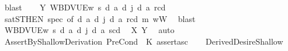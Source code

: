 \begin{isabellebody}
\ blast\isanewline
\ \ \isamarkupfalse%
\ Y{\isacharcolon}{\kern0pt}\ {\isachardoublequoteopen}{\isasymlangle}W{\isacharcomma}{\kern0pt}B{\isacharcomma}{\kern0pt}D{\isacharcomma}{\kern0pt}V{\isacharcomma}{\kern0pt}U{\isacharcomma}{\kern0pt}E{\isasymrangle}{\isacharcomma}{\kern0pt}w\ {\isasymTurnstile}\isactrlsup s\ {\isasymlparr}{\isasymD}\isactrlsup d\ a\ {\isacharparenleft}{\kern0pt}{\isasymB}\isactrlsup d\ j\ {\isacharparenleft}{\kern0pt}{\isasymB}\isactrlsup d\ a\ {\isacharbraceleft}{\kern0pt}r\isactrlsup c{\isacharbraceright}{\kern0pt}\isactrlsup d{\isacharparenright}{\kern0pt}{\isacharparenright}{\kern0pt}{\isasymrparr}{\isachardoublequoteclose}\isanewline
\ \ \ \ \isamarkupfalse%
\ satS{\isacharbrackleft}{\kern0pt}THEN\ spec{\isacharcomma}{\kern0pt}\ of\ {\isachardoublequoteopen}{\isasymD}\isactrlsup d\ a\ {\isacharparenleft}{\kern0pt}{\isasymB}\isactrlsup d\ j\ {\isacharparenleft}{\kern0pt}{\isasymB}\isactrlsup d\ a\ {\isacharbraceleft}{\kern0pt}r\isactrlsup c{\isacharbraceright}{\kern0pt}\isactrlsup d{\isacharparenright}{\kern0pt}{\isacharparenright}{\kern0pt}{\isachardoublequoteclose}{\isacharbrackright}{\kern0pt}\ m{}\ wW\ \isamarkupfalse%
\ blast\isanewline
\ \ \isamarkupfalse%
\ {\isachardoublequoteopen}{\isasymlangle}W{\isacharcomma}{\kern0pt}B{\isacharcomma}{\kern0pt}D{\isacharcomma}{\kern0pt}V{\isacharcomma}{\kern0pt}U{\isacharcomma}{\kern0pt}E{\isasymrangle}{\isacharcomma}{\kern0pt}w\ {\isasymTurnstile}\isactrlsup s\ {\isasymlparr}{\isasymD}\isactrlsup d\ a\ {\isacharparenleft}{\kern0pt}{\isasymB}\isactrlsup d\ j\ {\isacharparenleft}{\kern0pt}{\isasymB}\isactrlsup d\ a\ {\isacharbraceleft}{\kern0pt}s\isactrlsup c{\isacharbraceright}{\kern0pt}\isactrlsup d{\isacharparenright}{\kern0pt}{\isacharparenright}{\kern0pt}{\isasymrparr}{\isachardoublequoteclose}\ \isamarkupfalse%
\ X\ Y\ \isamarkupfalse%
\ auto\isanewline
{}\isamarkupfalse%
%
\endisatagproof
{\isafoldproof}%
%
\isadelimproof
\isanewline
%
\endisadelimproof
\isanewline
{}\isamarkupfalse%
\ AssertByShallowDerivation{\isacharcolon}{\kern0pt}\ {\isachardoublequoteopen}PreCond\ {\isacharbrackleft}{\kern0pt}{\isacharbrackright}{\kern0pt}\ {\isasymGamma}\isactrlsub K\ assert{\isacharbrackleft}{\kern0pt}a{\isacharcomma}{\kern0pt}s\isactrlsup c{\isacharbrackright}{\kern0pt}{\isachardoublequoteclose}\isanewline
%
\isadelimproof
\ \ %
\endisadelimproof
%
\isatagproof
{}\isamarkupfalse%
\ DerivedDesireShallow\ \isamarkupfalse%

\end{isabellebody}
